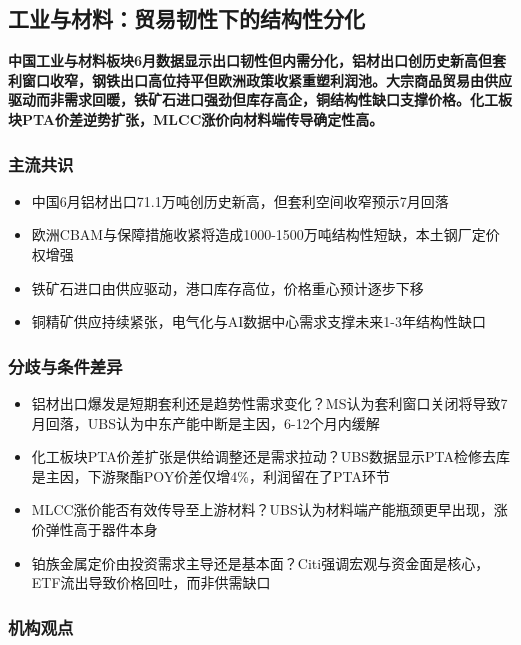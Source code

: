 \documentclass[11pt]{ctexart}
\begin{document}
\subsection{工业与材料：贸易韧性下的结构性分化}
\textbf{中国工业与材料板块6月数据显示出口韧性但内需分化，铝材出口创历史新高但套利窗口收窄，钢铁出口高位持平但欧洲政策收紧重塑利润池。大宗商品贸易由供应驱动而非需求回暖，铁矿石进口强劲但库存高企，铜结构性缺口支撑价格。化工板块PTA价差逆势扩张，MLCC涨价向材料端传导确定性高。}
\subsubsection*{主流共识}
\begin{itemize}
  \item 中国6月铝材出口71.1万吨创历史新高，但套利空间收窄预示7月回落
  \item 欧洲CBAM与保障措施收紧将造成1000-1500万吨结构性短缺，本土钢厂定价权增强
  \item 铁矿石进口由供应驱动，港口库存高位，价格重心预计逐步下移
  \item 铜精矿供应持续紧张，电气化与AI数据中心需求支撑未来1-3年结构性缺口
\end{itemize}
\subsubsection*{分歧与条件差异}
\begin{itemize}
  \item 铝材出口爆发是短期套利还是趋势性需求变化？MS认为套利窗口关闭将导致7月回落，UBS认为中东产能中断是主因，6-12个月内缓解
  \item 化工板块PTA价差扩张是供给调整还是需求拉动？UBS数据显示PTA检修去库是主因，下游聚酯POY价差仅增4\%，利润留在了PTA环节
  \item MLCC涨价能否有效传导至上游材料？UBS认为材料端产能瓶颈更早出现，涨价弹性高于器件本身
  \item 铂族金属定价由投资需求主导还是基本面？Citi强调宏观与资金面是核心，ETF流出导致价格回吐，而非供需缺口
\end{itemize}
\subsubsection*{机构观点}
\end{document}
